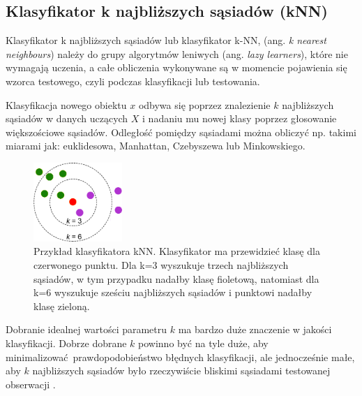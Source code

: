 \subsection{Klasyfikator k najbliższych sąsiadów (kNN)}
Klasyfikator k najbliższych sąsiadów lub klasyfikator k-NN, (ang. \textit{k nearest neighbours}) należy do grupy algorytmów leniwych (ang. \textit{lazy learners}), które nie wymagają uczenia, a całe obliczenia wykonywane są w momencie pojawienia się wzorca testowego, czyli podczas klasyfikacji lub testowania. \par
Klasyfikacja nowego obiektu $x$ odbywa się poprzez znalezienie $k$ najbliższych sąsiadów w danych uczących $X$ i nadaniu mu nowej klasy poprzez głosowanie większościowe sąsiadów. Odległość pomiędzy sąsiadami można obliczyć np. takimi miarami jak: euklidesowa, Manhattan, Czebyszewa lub Minkowskiego. \\
\begin{figure}[H]
	\centering
	\includegraphics[width=0.3\textwidth]{./images/knn.png}
	\caption{Przykład klasyfikatora kNN. Klasyfikator ma przewidzieć klasę dla czerwonego punktu. Dla k=3 wyszukuje trzech najbliższych sąsiadów, w tym przypadku nadałby klasę fioletową, natomiast dla k=6 wyszukuje sześciu najbliższych sąsiadów i punktowi nadałby klasę zieloną.}
	\label{fig:klasknn}
\end{figure}
Dobranie idealnej wartości parametru $k$ ma bardzo duże znaczenie w jakości klasyfikacji. Dobrze dobrane $k$ powinno być na tyle duże, aby minimalizować prawdopodobieństwo błędnych klasyfikacji, ale jednocześnie małe, aby $k$ najbliższych sąsiadów było rzeczywiście bliskimi sąsiadami testowanej obserwacji \cite{Bishop}. 
